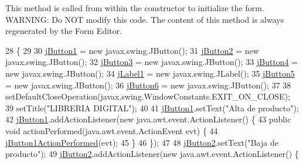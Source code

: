 This method is called from within the constructor to initialize the form. W\+A\+R\+N\+I\+NG\+: Do N\+OT modify this code. The content of this method is always regenerated by the Form Editor. 
\begin{DoxyCode}
28                                   \{
29 
30         \mbox{\hyperlink{class_interfaz_package_1_1_interfaz_admin_a9105aba7ae58736d959752db09b708a7}{jButton1}} = \textcolor{keyword}{new} javax.swing.JButton();
31         \mbox{\hyperlink{class_interfaz_package_1_1_interfaz_admin_acc936e9e831e0d280f8bd3d6215d69d1}{jButton2}} = \textcolor{keyword}{new} javax.swing.JButton();
32         \mbox{\hyperlink{class_interfaz_package_1_1_interfaz_admin_a1c49c5af96e421af2c0e3e773995db35}{jButton3}} = \textcolor{keyword}{new} javax.swing.JButton();
33         \mbox{\hyperlink{class_interfaz_package_1_1_interfaz_admin_abe45cfffa25b1f68f153eb8dfed74132}{jButton4}} = \textcolor{keyword}{new} javax.swing.JButton();
34         \mbox{\hyperlink{class_interfaz_package_1_1_interfaz_admin_a616ba73f041fc46fb10107d67b98f5ad}{jLabel1}} = \textcolor{keyword}{new} javax.swing.JLabel();
35         \mbox{\hyperlink{class_interfaz_package_1_1_interfaz_admin_a158621407bca85eb067b4d84fb15f8f8}{jButton5}} = \textcolor{keyword}{new} javax.swing.JButton();
36         \mbox{\hyperlink{class_interfaz_package_1_1_interfaz_admin_aed43fc05f792f94859d625d8c69e9858}{jButton6}} = \textcolor{keyword}{new} javax.swing.JButton();
37 
38         setDefaultCloseOperation(javax.swing.WindowConstants.EXIT\_ON\_CLOSE);
39         setTitle(\textcolor{stringliteral}{"LIBRERIA DIGITAL"});
40 
41         \mbox{\hyperlink{class_interfaz_package_1_1_interfaz_admin_a9105aba7ae58736d959752db09b708a7}{jButton1}}.setText(\textcolor{stringliteral}{"Alta de producto"});
42         \mbox{\hyperlink{class_interfaz_package_1_1_interfaz_admin_a9105aba7ae58736d959752db09b708a7}{jButton1}}.addActionListener(\textcolor{keyword}{new} java.awt.event.ActionListener() \{
43             \textcolor{keyword}{public} \textcolor{keywordtype}{void} actionPerformed(java.awt.event.ActionEvent evt) \{
44                 \mbox{\hyperlink{class_interfaz_package_1_1_interfaz_admin_aaf879a69301dfeae37ba0aa729170d62}{jButton1ActionPerformed}}(evt);
45             \}
46         \});
47 
48         \mbox{\hyperlink{class_interfaz_package_1_1_interfaz_admin_acc936e9e831e0d280f8bd3d6215d69d1}{jButton2}}.setText(\textcolor{stringliteral}{"Baja de producto"});
49         \mbox{\hyperlink{class_interfaz_package_1_1_interfaz_admin_acc936e9e831e0d280f8bd3d6215d69d1}{jButton2}}.addActionListener(\textcolor{keyword}{new} java.awt.event.ActionListener() \{

\end{DoxyCode}
